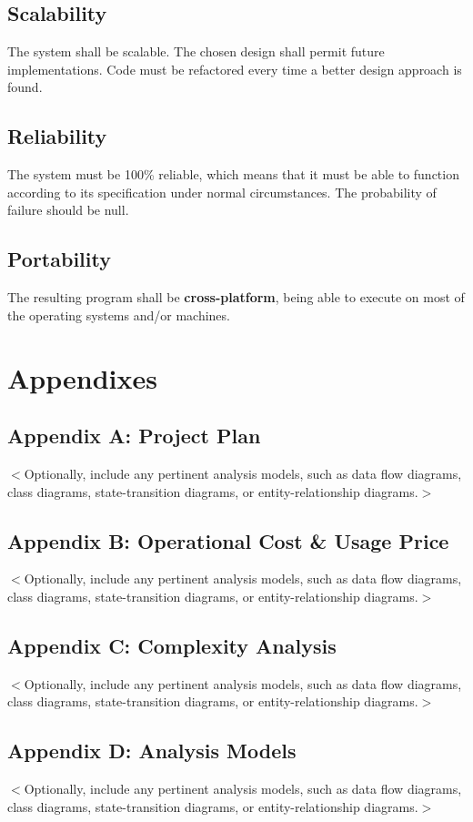\documentclass{scrreprt}
\begin{document}
\section{Scalability}
The system shall be scalable. The chosen design shall permit future implementations. Code must be refactored every time a better design approach is found.

\section{Reliability}

The system must be 100\% reliable, which means that it must be able to function according to its specification under normal circumstances. The probability of failure should be null.

\section{Portability}

The resulting program shall be \textbf{cross-platform}, being able to execute on most of the operating systems and/or machines.

\chapter{Appendixes}

\section{Appendix A: Project Plan}
$<$Optionally, include any pertinent analysis models, such as data flow 
diagrams, class diagrams, state-transition diagrams, or entity-relationship 
diagrams.$>$

\section{Appendix B: Operational Cost \& Usage Price}
$<$Optionally, include any pertinent analysis models, such as data flow 
diagrams, class diagrams, state-transition diagrams, or entity-relationship 
diagrams.$>$

\section{Appendix C: Complexity Analysis}
$<$Optionally, include any pertinent analysis models, such as data flow 
diagrams, class diagrams, state-transition diagrams, or entity-relationship 
diagrams.$>$

\section{Appendix D: Analysis Models}
$<$Optionally, include any pertinent analysis models, such as data flow 
diagrams, class diagrams, state-transition diagrams, or entity-relationship 
diagrams.$>$
\end{document}
